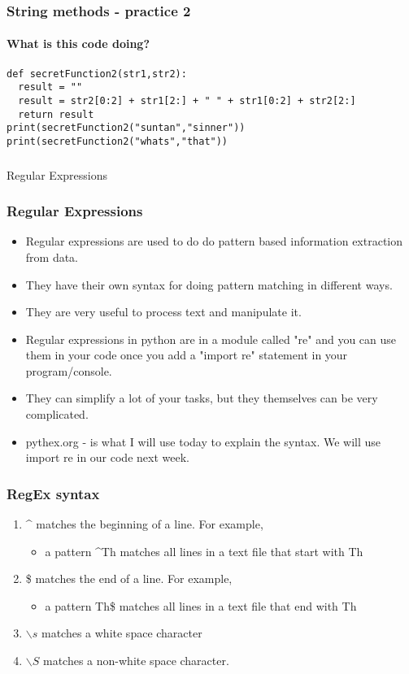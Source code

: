 \documentclass{beamer}
\begin{document}
\begin{frame}[fragile]
\frametitle{String methods - practice 2}
\framesubtitle{What is this code doing?} \small
\begin{verbatim}
def secretFunction2(str1,str2):
  result = ""
  result = str2[0:2] + str1[2:] + " " + str1[0:2] + str2[2:]
  return result
print(secretFunction2("suntan","sinner"))
print(secretFunction2("whats","that"))
\end{verbatim}
\end{frame}


\begin{frame}
\frametitle{}
\centering
\Large Regular Expressions
\end{frame}

\begin{frame}
\frametitle{Regular Expressions}
\begin{itemize}
\item Regular expressions are used to do do pattern based information extraction from data. 
\item They have their own syntax for doing pattern matching in different ways.
\item They are very useful to process text and manipulate it.
\item Regular expressions in python are in a module called "re" and you can use them in your code once you add a "import re" statement in your program/console.
\item They can simplify a lot of your tasks, but they themselves can be very complicated.
\item pythex.org - is what I will use today to explain the syntax. We will use import re in our code next week.
\end{itemize}
\end{frame}

\begin{frame}
\frametitle{RegEx syntax}
\begin{enumerate}
\item \^{} matches the beginning of a line. For example,
\begin{itemize}
\item a pattern \^{}Th matches all lines in a text file that start with Th
\end{itemize}
\item \$ matches the end of a line. For example,
\begin{itemize}
\item a pattern Th\$ matches all lines in a text file that end with Th
\end{itemize}
\item $\backslash s$ matches a white space character
\item $\backslash S$  matches a non-white space character.
\end{enumerate}
\end{frame}
\end{document}
